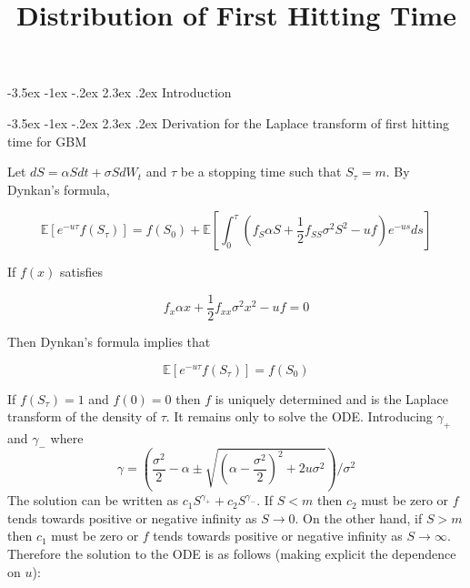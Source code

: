\documentclass[12pt]{article}
\title{Distribution of First Hitting Time}
\makeatletter
\renewcommand\section{\@startsection{section}{1}{\z@}%
                                  {-3.5ex \@plus -1ex \@minus -.2ex}%
                                  {2.3ex \@plus.2ex}%
                                  {\normalfont\large\bfseries}}
\makeatother
\begin{document}

\setlength{\parindent}{0pt}












\maketitle
\section{Introduction}

\section{Derivation for the Laplace transform of first hitting time for GBM}

Let \(dS=\alpha S dt+\sigma S dW_t\) and \(\tau\) be a stopping time such that \(S_\tau=m\).  By Dynkan's formula, 

\[\mathbb{E} [e^{-u\tau}f(S_\tau)]=f(S_0)+\mathbb{E}\left[ \int_0  ^ \tau \left(f_{S} \alpha S + \frac{1}{2} f_{SS} \sigma^2 S^2-uf\right) e^{-us} ds\right]\]

If \(f(x)\) satisfies 

\[f_x \alpha x+\frac{1}{2} f_{xx} \sigma^2 x^2 -uf=0\]

Then Dynkan's formula implies that 

\[\mathbb{E}[e^{-u\tau} f(S_\tau)]=f(S_0)\]

If \(f(S_\tau)=1\) and \(f(0)=0\) then \(f\) is uniquely determined and is the Laplace transform of the density of \(\tau\).  It remains only to solve the ODE.  Introducing \(\gamma_+\) and \(\gamma_{-}\) where \[\gamma =  \left(\frac{\sigma^2}{2}-\alpha  \pm \sqrt{\left(\alpha -\frac{\sigma^2}{2}\right)^2+2u\sigma^2}\right)/\sigma^2\]
The solution can be written as \(c_1 S ^ {\gamma_+}+c_2 S^{\gamma_{-}}\).   If \(S<m\) then \(c_2\) must be zero or \(f\) tends towards positive or negative infinity as \(S \to 0\).  On the other hand, if \(S>m\) then \(c_1\) must be zero or \(f\) tends towards positive or negative infinity as \(S \to \infty\).  Therefore the solution to the ODE is as follows (making explicit the dependence on \(u\)):
\end{document}
